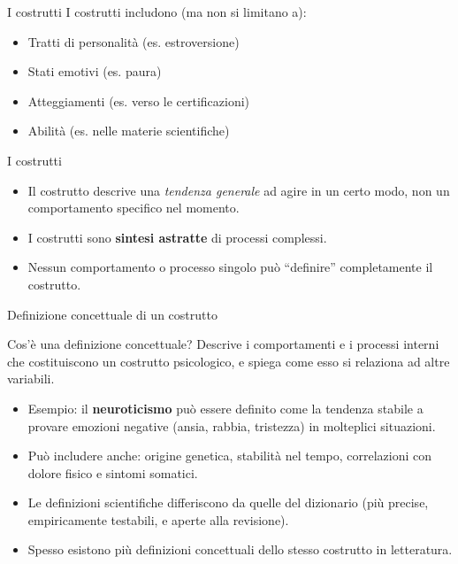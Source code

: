 \documentclass{beamer}
\begin{document}
\begin{frame}{I costrutti}
I costrutti includono (ma non si limitano a):
    \begin{itemize}
      \item Tratti di personalità (es. estroversione)
      \item Stati emotivi (es. paura)
      \item Atteggiamenti (es. verso le certificazioni)
      \item Abilità (es. nelle materie scientifiche)
    \end{itemize}
\end{frame}

\begin{frame}{I costrutti}
  \begin{itemize}
    \item Il costrutto descrive una \textit{tendenza generale} ad agire in un certo modo, non un comportamento specifico nel momento.
    \item I costrutti sono \textbf{sintesi astratte} di processi complessi.
    \item Nessun comportamento o processo singolo può “definire” completamente il costrutto.
  \end{itemize}
\end{frame}

\begin{frame}{Definizione concettuale di un costrutto}
  \begin{block}{Cos'è una definizione concettuale?}
    Descrive i comportamenti e i processi interni che costituiscono un costrutto psicologico, e spiega come esso si relaziona ad altre variabili.
  \end{block}
  \pause
  \begin{itemize}
    \item Esempio: il \textbf{neuroticismo} può essere definito come la tendenza stabile a provare emozioni negative (ansia, rabbia, tristezza) in molteplici situazioni.
    \item Può includere anche: origine genetica, stabilità nel tempo, correlazioni con dolore fisico e sintomi somatici.
    \pause
    \item Le definizioni scientifiche differiscono da quelle del dizionario (più precise, empiricamente testabili, e aperte alla revisione).
    \item Spesso esistono più definizioni concettuali dello stesso costrutto in letteratura.
  \end{itemize}
\end{frame}
\end{document}

